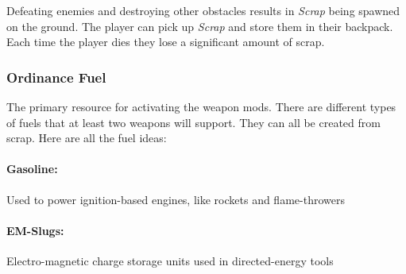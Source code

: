 \documentclass[../Main.tex]{subfiles}
\begin{document}
Defeating enemies and destroying other obstacles results in \emph{Scrap} being spawned on the ground. The player can pick up \emph{Scrap} and store them in their backpack. Each time the player dies they lose a significant amount of scrap.

\subsubsection{Ordinance Fuel}

The primary resource for activating the weapon mods. There are different types of fuels that at least two weapons will support. They can all be created from scrap. Here are all the fuel ideas:

\paragraph{Gasoline:} Used to power ignition-based engines, like rockets and flame-throwers

\paragraph{EM-Slugs:} Electro-magnetic charge storage units used in directed-energy tools
\end{document}
